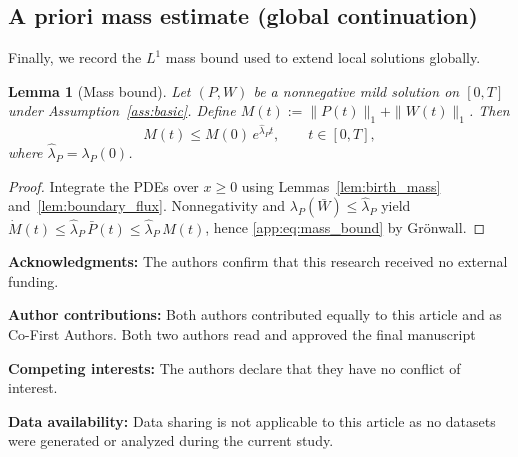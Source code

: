 \documentclass[pdflatex,sn-mathphys-ay]{sn-jnl}
\theoremstyle{thmstyleone}
\newtheorem{lemma}[theorem]{Lemma}
\theoremstyle{definition}
\theoremstyle{remark}
\begin{document}
\begin{appendices}
\subsection{A priori mass estimate (global continuation)}
\label{app:mass_est}
Finally, we record the $L^1$ mass bound used to extend local solutions globally.

\begin{lemma}[Mass bound]\label{lem:mass_bound}
Let $(P,W)$ be a nonnegative mild solution on $[0,T]$ under Assumption~\ref{ass:basic}.
Define $M(t):=\|P(t)\|_1+\|W(t)\|_1$. Then
\begin{equation}\label{app:eq:mass_bound}
M(t)\le M(0)\,e^{\hat\lambda_P t},\qquad t\in[0,T],
\end{equation}
where $\hat\lambda_P=\lambda_P(0)$.
\end{lemma}

\begin{proof}
Integrate the PDEs over $x\ge 0$ using Lemmas~\ref{lem:birth_mass} and~\ref{lem:boundary_flux}.
Nonnegativity and $\lambda_P(\bar W)\le\hat\lambda_P$ yield
$\dot M(t)\le \hat\lambda_P\,\bar P(t)\le \hat\lambda_P\,M(t)$, hence \eqref{app:eq:mass_bound}
by Gr\"onwall.
\end{proof}

\end{appendices}


\medskip\noindent\textbf{Acknowledgments:}  
The authors confirm that this research received no external funding.

\medskip\noindent\textbf{Author contributions:}  
Both authors contributed equally to this article and as Co-First Authors. Both two authors read and approved the final
manuscript


\medskip\noindent\textbf{Competing interests:}  
The authors declare that they have no conflict of interest.

\medskip\noindent\textbf{Data availability:}  
Data sharing is not applicable to this article as no datasets were generated or analyzed during the current study.


\end{document}
